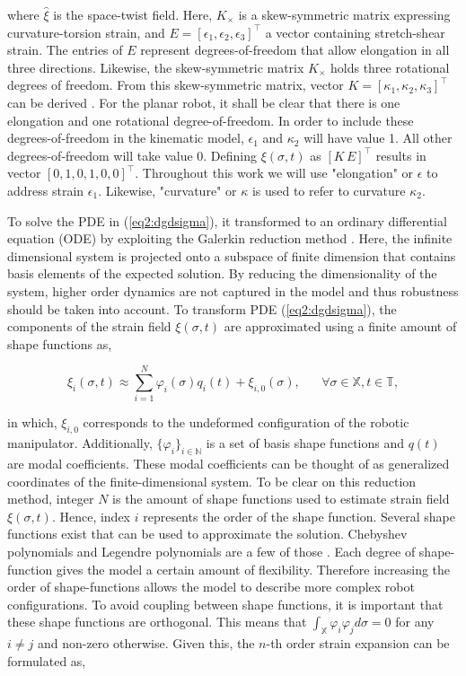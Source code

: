 where $\hat{\xi}$ is the space-twist field. Here, $K_\times$ is a skew-symmetric matrix expressing curvature-torsion strain, and $E = [\epsilon_1,\epsilon_2,\epsilon_3]^\top$ a vector containing stretch-shear strain. The entries of $E$ represent  degrees-of-freedom that allow elongation in all three directions. Likewise, the skew-symmetric matrix $K_{\times}$ holds three rotational degrees of freedom.  From this skew-symmetric matrix, vector $K = [\kappa_1,\kappa_2,\kappa_3]^\top$ can be derived \cite{Sola2018}. For the planar robot, it shall be clear that there is one elongation and one rotational degree-of-freedom. In order to include these degrees-of-freedom in the kinematic model, $\epsilon_1$ and $\kappa_2$ will have value 1. All other degrees-of-freedom will take value 0. Defining $\xi(\sigma,t)$ as $[K \hspace{2pt} E]^\top$ results in vector $[0,1,0,1,0,0]^\top$. Throughout this work we will use "elongation" or $\epsilon$ to address strain $\epsilon_1$. Likewise, "curvature" or $\kappa$ is used to refer to curvature $\kappa_2$.

To solve the PDE in (\ref{eq2:dgdsigma}), it transformed to an ordinary differential equation (ODE) by exploiting the Galerkin reduction method \cite{Galerkin}. Here, the infinite dimensional system is projected onto a subspace of finite dimension that contains basis elements of the expected solution. By reducing the dimensionality of the system, higher order dynamics are not captured in the model and thus robustness should be taken into account. To transform PDE (\ref{eq2:dgdsigma}), the components of the strain field $\xi(\sigma,t)$ are approximated using a finite amount of shape functions as,

\begin{equation}
    \xi_i(\sigma,t) \approx \sum_{i=1}^N \varphi_i(\sigma)q_i(t) + \xi_{i,0}(\sigma), \hspace{20pt} \forall \sigma \in \mathbb{X}, t \in \mathbb{T},
\end{equation}

in which, $\xi_{i,0}$ corresponds to the undeformed configuration of the robotic manipulator. Additionally, $\{\varphi_i\}_{i \in \mathbb{N}}$ is a set of basis shape functions and $q(t)$ are modal coefficients. These modal coefficients can be thought of as generalized coordinates of the finite-dimensional system. To be clear on this reduction method, integer $N$ is the amount of shape functions used to estimate strain field $\xi(\sigma,t)$. Hence, index $i$ represents the order of the shape function. Several shape functions exist that can be used to approximate the solution. Chebyshev polynomials and Legendre polynomials are a few of those \cite{Galerkin}. Each degree of shape-function gives the model a certain amount of flexibility. Therefore increasing the order of shape-functions allows the model to describe more complex robot configurations. To avoid coupling between shape functions,  it is important that these shape functions are orthogonal. This means that $\int_\mathbb{X} \varphi_i \varphi_j d \sigma = 0$ for any $i \neq j$ and non-zero otherwise. Given this, the $n$-th order strain expansion can be formulated as,

